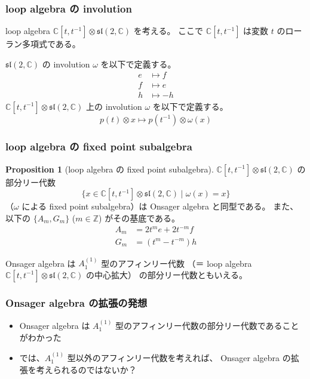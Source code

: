 \documentclass{beamer}
\theoremstyle{definition}
\newtheorem{proposition}{Proposition}
\begin{document}
\begin{frame}
    \frametitle{loop algebra の involution}

    loop algebra \(\mathbb{C}[t,t^{-1}] \otimes \mathfrak{sl}(2,\mathbb{C})\) を考える。
    ここで \(\mathbb{C}[t,t^{-1}]\) は変数 \(t\) のローラン多項式である。

    \begin{definition}
        \(\mathfrak{sl}(2,\mathbb{C})\) の involution \(\omega \) を以下で定義する。
        \begin{align*}
            e & \mapsto f  \\
            f & \mapsto e  \\
            h & \mapsto -h
        \end{align*}
        \(\mathbb{C}[t,t^{-1}] \otimes \mathfrak{sl}(2,\mathbb{C})\) 上の
        involution \(\omega \) を以下で定義する。
        \[
            p(t) \otimes x \mapsto p(t^{-1}) \otimes \omega(x)
        \]
    \end{definition}
\end{frame}

\begin{frame}
    \frametitle{loop algebra の fixed point subalgebra}

    \begin{proposition}[loop algebra の fixed point subalgebra]
        \(\mathbb{C}[t,t^{-1}] \otimes \mathfrak{sl}(2,\mathbb{C})\) の部分リー代数
        \[
            \{ x \in \mathbb{C}[t,t^{-1}] \otimes \mathfrak{sl}(2,\mathbb{C}) \mid \omega(x) = x \}
        \]
        （\(\omega \) による fixed point subalgebra）は Onsager algebra と同型である。
        また、以下の \( \{A_m, G_m\} \) (\( m \in \mathbb{Z} \)) がその基底である。
        \begin{align*}
            A_m & = 2t^m e + 2t^{-m} f \\
            G_m & = (t^m - t^{-m}) h
        \end{align*}
    \end{proposition}

    Onsager algebra は \(A_1^{(1)}\) 型のアフィンリー代数
    （＝ loop algebra \(\mathbb{C}[t,t^{-1}] \otimes \mathfrak{sl}(2,\mathbb{C})\) の中心拡大）
    の部分リー代数ともいえる。
\end{frame}

\begin{frame}
    \frametitle{Onsager algebra の拡張の発想}

    \begin{itemize}
        \item Onsager algebra は \(A_1^{(1)}\) 型のアフィンリー代数の部分リー代数であることがわかった
        \item では、\(A_1^{(1)}\) 型以外のアフィンリー代数を考えれば、
              Onsager algebra の拡張を考えられるのではないか？
    \end{itemize}
\end{frame}
\end{document}
